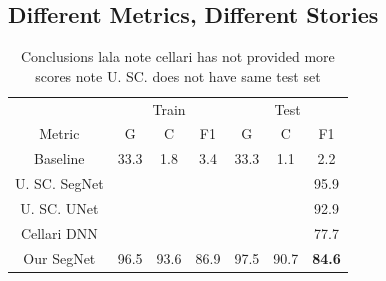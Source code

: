 \documentclass[
]{dtuposter}
\begin{document}
\begin{dtupostercontent}

\section{Different Metrics, Different Stories}

\begin{table}
	\begin{tabular}{c|ccc|ccc|}
		
		\rule[-1ex]{0pt}{2.5ex}  & \multicolumn{3}{c|}{Train} &  \multicolumn{3}{c|}{Test} \\ 
		
		\rule[-1ex]{0pt}{2.5ex} Metric  & G & C & F1 & G & C & F1 \\ 
		\hline
		\rule[-1ex]{0pt}{2.5ex} Baseline&  33.3 &1.8  &3.4  &33.3  &1.1  &2.2  \\ 
		
		\rule[-1ex]{0pt}{2.5ex} U. SC. SegNet    &  &  &  &  &  &95.9  \\ 
		\rule[-1ex]{0pt}{2.5ex} U. SC. UNet   &  &  &  &  &  &92.9  \\ 
		\rule[-1ex]{0pt}{2.5ex} Cellari DNN   &  &  &  &  &  &77.7  \\ 
		\hline 
		\rule[-1ex]{0pt}{2.5ex} Our SegNet & 96.5&93.6  & 86.9 &97.5  & 90.7  &\textbf{84.6}  \\ 
	\end{tabular} 
\caption{Conclusions lala note cellari has not provided more scores note U. SC. does not have same test set}
\end{table}





\end{dtupostercontent}
\end{document}

